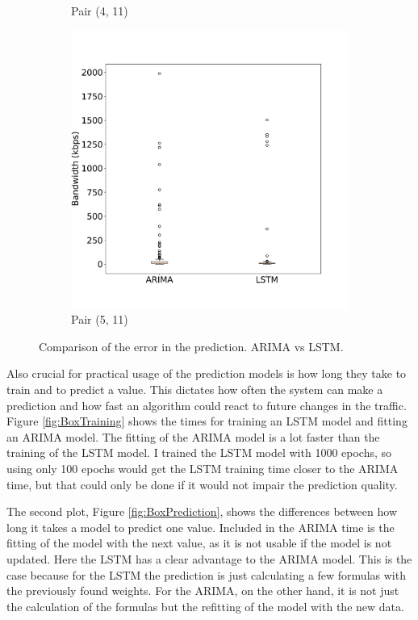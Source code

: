 \begin{figure}
\begin{subfigure}{0.42\linewidth}
		\caption{Pair (4, 11)}
		\label{fig:BoxERRORprediction_3}
	\end{subfigure}
	\begin{subfigure}{0.42\linewidth}
		\centering
		\includegraphics[width=1\linewidth]{Pictures/Practical_Examples/BoxERRORprediction_4}
		\caption{Pair (5, 11)}
		\label{fig:BoxERRORprediction_4}
	\end{subfigure}
	\caption{Comparison of the error in the prediction. ARIMA vs LSTM.}
	\label{fig:BoxERRORprediction}
\end{figure}

Also crucial for practical usage of the prediction models is how long they take to train and to predict a value.
This dictates how often the system can make a prediction and how fast an algorithm could react to future changes in the traffic.
Figure \ref{fig:BoxTraining} shows the times for training an LSTM model and fitting an ARIMA model.
The fitting of the ARIMA model is a lot faster than the training of the LSTM model.
I trained the LSTM model with 1000 epochs, so using only 100 epochs would get the LSTM training time closer to the ARIMA time, but that could only be done if it would not impair the prediction quality.

The second plot, Figure \ref{fig:BoxPrediction}, shows the differences between how long it takes a model to predict one value.
Included in the ARIMA time is the fitting of the model with the next value, as it is not usable if the model is not updated.
Here the LSTM has a clear advantage to the ARIMA model.
This is the case because for the LSTM the prediction is just calculating a few formulas with the previously found weights.
For the ARIMA, on the other hand, it is not just the calculation of the formulas but the refitting of the model with the new data.


